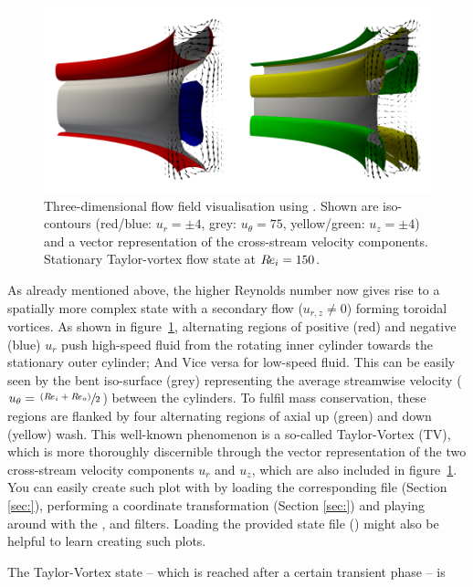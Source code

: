 \documentclass[a4paper, 11pt, DIV=11]{scrartcl}
\begin{document}
\begin{figure}
\includegraphics[width=1.00\textwidth]{figures/tc0041/vectorPlot.png}
\caption{Three-dimensional flow field visualisation using .
Shown are iso-contours (red/blue: $u_{r}=\pm\num{4}$, grey:
$u_{\theta}=\num{75}$, yellow/green: $u_{z}=\pm\num{4}$) and a vector
representation of the cross-stream velocity components. Stationary
Taylor-vortex flow state at $R\hspace{-0.1em}e_{i}=\num{150}$.}
\label{fig:tc0041vectorPlot}
\end{figure}
As already mentioned above, the higher Reynolds number now gives rise
to a spatially more complex state with a secondary flow ($u_{r,z}\neq\num{0}$)
forming toroidal vortices. As shown in figure~\ref{fig:tc0041vectorPlot},
alternating regions of positive (red) and negative (blue) $u_r$ push high-speed
fluid from the rotating inner cylinder towards the stationary outer cylinder;
And Vice versa for low-speed fluid. This can be easily seen by the bent
iso-surface (grey) representing the average streamwise velocity 
($u_{\theta}=\sfrac{\left(R\hspace{-0.1em}e_{i}+R\hspace{-0.1em}e_{o}\right)}{2}$) between the cylinders.
To fulfil mass conservation, these regions are flanked by four alternating regions of
axial up (green) and down (yellow) wash. This well-known phenomenon is a so-called
Taylor-Vortex (TV), which is more thoroughly discernible through the vector representation
of the two cross-stream velocity components $u_{r}$ and $u_{z}$, which are also included
in figure~\ref{fig:tc0041vectorPlot}. You can easily create such plot with 
by loading the corresponding  file (Section \ref{sec:}), performing a coordinate
transformation (Section \ref{sec:}) and playing around with the ,
 and  filters. Loading the provided state file () might also be helpful to learn creating such plots.
\par
The Taylor-Vortex state -- which is reached after a certain transient phase -- is
\end{document}

